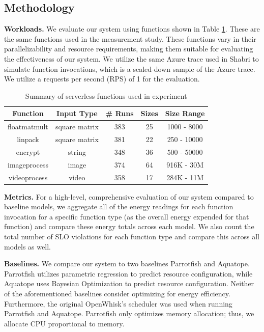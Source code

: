 \documentclass[times, 10pt,twocolumn]{article}
\begin{document}
\subsection{Methodology}
\textbf{Workloads.} We evaluate our system using functions shown in Table \ref{tab:summary_of_serverless_functions}. These are the same functions used in the measurement study. These functions vary in their parallelizability and resource requirements, making them suitable for evaluating the effectiveness of our system. We utilize the same Azure trace used in Shabri \cite{sinha2024shabari} to simulate function invocations, which is a scaled-down sample of the Azure trace. We utilize a requests per second (RPS) of 1 for the evaluation.

\begin{table}[htbp]
  \centering
  \begin{tabular}{|c|c|c|c|c|}
  \hline
  \textbf{Function} & \textbf{Input Type} & \textbf{\# Runs} & \textbf{Sizes} & \textbf{Size Range} \\ \hline
  floatmatmult & square matrix & 383 & 25 & 1000 - 8000 \\ \hline
  linpack & square matrix & 381 & 22 & 250 - 10000 \\ \hline
  encrypt & string & 348 & 36 & 500 - 50000 \\ \hline
  imageprocess & image & 374 & 64 & 916K - 30M \\ \hline
  videoprocess & video & 358 & 17 & 284K - 11M \\ \hline
  \end{tabular}
  \caption{Summary of serverless functions used in experiment}
  \label{tab:summary_of_serverless_functions}
\end{table}

\textbf{Metrics.} For a high-level, comprehensive evaluation of our system compared to baseline models, we aggregate all of the energy readings for each function invocation for a specific function type (as the overall energy expended for that function) and compare these energy totals across each model. We also count the total number of SLO violations for each function type and compare this across all models as well.

\textbf{Baselines.} We compare our system to two baselines Parrotfish and Aquatope. Parrotfish \cite{parrotfish} utilizes parametric regression to predict resource configuration, while Aquatope \cite{aquatope} uses Bayesian Optimization to predict resource configuration. Neither of the aforementioned baselines consider optimizing for energy efficiency. Furthermore, the original OpenWhisk's scheduler was used when running Parrotfish and Aquatope. Parrotfish only optimizes memory allocation; thus, we allocate CPU proportional to memory. 
\end{document}
